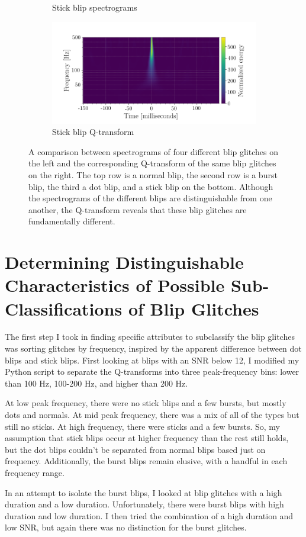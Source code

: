 \documentclass[a4paper]{article}
\begin{document}
\begin{figure}
\begin{subfigure}[t]{.7\textwidth}
		\caption{Stick blip spectrograms}
		\label{fig:stick_s}
	\end{subfigure}
	\begin{subfigure}[t]{.29\textwidth}
		\centering
		\includegraphics[width=1.1\linewidth]{stick_blip}
		\caption{Stick blip Q-transform}
		\label{fig:stick_q}
	\end{subfigure}
	\caption{A comparison between spectrograms of four different blip glitches on the left and the corresponding Q-transform of the same blip glitches on the right. The top row is a normal blip, the second row is a burst blip, the third a dot blip, and a stick blip on the bottom. Although the spectrograms of the different blips are distinguishable from one another, the Q-transform reveals that these blip glitches are fundamentally different.}
	\label{fig:comparison}
\end{figure}

\section{Determining Distinguishable Characteristics of Possible Sub-Classifications of Blip Glitches}

The first step I took in finding specific attributes to subclassify the blip glitches was sorting glitches by frequency, inspired by the apparent difference between dot blips and stick blips. First looking at blips with an SNR below 12, I modified my Python script to separate the Q-transforms into three peak-frequency bins: lower than 100 Hz, 100-200 Hz, and higher than 200 Hz. 

At low peak frequency, there were no stick blips and a few bursts, but mostly dots and normals. At mid peak frequency, there was a mix of all of the types but still no sticks. At high frequency, there were sticks and a few bursts. So, my assumption that stick blips occur at higher frequency than the rest still holds, but the dot blips couldn't be separated from normal blips based just on frequency. Additionally, the burst blips remain elusive, with a handful in each frequency range.

In an attempt to isolate the burst blips, I looked at blip glitches with a high duration and a low duration. Unfortunately, there were burst blips with high duration and low duration. I then tried the combination of a high duration and low SNR, but again there was no distinction for the burst glitches. 




\end{document}
